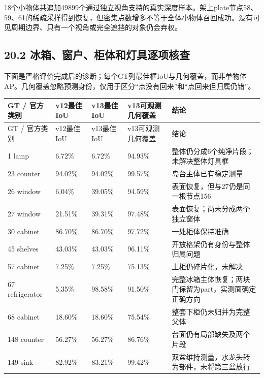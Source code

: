 \documentclass[UTF8,fontset=fandol]{ctexart}
\begin{document}
18个小物体共追加49899个通过独立视角支持的真实深度样本。架上plate节点58、59、61的稀疏采样得到恢复，但密集点数增多不等于全体小物体召回成功。没有可见周期边界、只有一个视角或完全遮挡的对象仍会弃权。



\subsection*{20.2 冰箱、窗户、柜体和灯具逐项核查}

下面是严格评价完成后的诊断；每个GT列最佳框IoU与几何覆盖，而非单物体AP。几何覆盖忽略预测身份，仅用于区分“点没有回来”和“点回来但归属仍错”。



{\small
\begin{longtable}{|p{}|p{}|p{}|p{}|p{}|}
\hline
GT / 官方类别 & v12最佳IoU & v13最佳IoU & v13可观测几何覆盖 & 结论 \\ \hline
\endfirsthead
\hline
GT / 官方类别 & v12最佳IoU & v13最佳IoU & v13可观测几何覆盖 & 结论 \\ \hline
\endhead
1 lamp & 6.72\% & 6.72\% & 94.93\% & 整体仍分成6个纯净片段；未解决整体灯具框 \\ \hline
23 counter & 94.02\% & 94.02\% & 99.57\% & 岛台主体已有稳定测量 \\ \hline
26 window & 6.04\% & 39.05\% & 94.59\% & 表面恢复，但与27仍是同一根节点156 \\ \hline
27 window & 21.51\% & 39.31\% & 97.48\% & 表面恢复；尚未分成两个独立窗体 \\ \hline
30 cabinet & 86.70\% & 86.70\% & 97.72\% & 一处柜体保持准确 \\ \hline
45 shelves & 43.03\% & 43.03\% & 96.11\% & 开放格架仍有身份与整体归属问题 \\ \hline
57 cabinet & 7.25\% & 7.25\% & 75.13\% & 上柜仍碎片化，未解决 \\ \hline
67 refrigerator & 5.35\% & 98.58\% & 91.50\% & 完整冰箱主体恢复；两块门保留为part，实测面确定正确方向 \\ \hline
68 cabinet & 18.60\% & 18.60\% & 75.54\% & 整套下柜仍未归并为完整父体 \\ \hline
148 counter & 56.27\% & 56.27\% & 86.76\% & 台面仍有局部缺失及两个片段 \\ \hline
149 sink & 82.92\% & 83.21\% & 99.42\% & 双盆维持测量，水龙头转为部件，未将第三盆放行 \\ \hline
\end{longtable}
}
\end{document}
